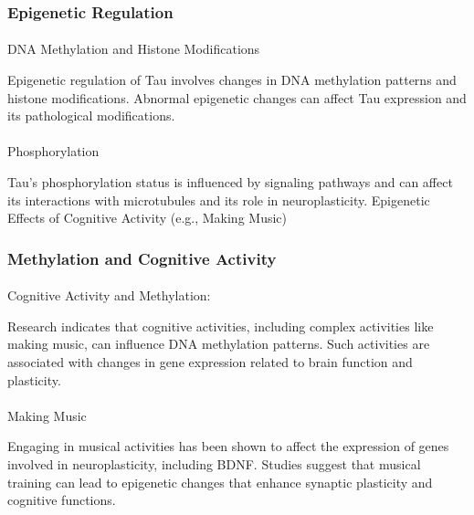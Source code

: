 \documentclass[
]{agujournal2019}
\makeatletter
\let\oldparagraph\paragraph
\renewcommand{\paragraph}{
    \@ifstar
      \xxxParagraphStar
      \xxxParagraphNoStar
  }
\newcommand{\xxxParagraphStar}[1]{\oldparagraph*{#1}\mbox{}}
\newcommand{\xxxParagraphNoStar}[1]{\oldparagraph{#1}\mbox{}}
\makeatother
\begin{document}
\subsubsection{Epigenetic Regulation}\label{epigenetic-regulation-2}

\paragraph{DNA Methylation and Histone
Modifications}\label{dna-methylation-and-histone-modifications}

Epigenetic regulation of Tau involves changes in DNA methylation
patterns and histone modifications. Abnormal epigenetic changes can
affect Tau expression and its pathological modifications.

\paragraph{Phosphorylation}\label{phosphorylation}

Tau's phosphorylation status is influenced by signaling pathways and can
affect its interactions with microtubules and its role in
neuroplasticity. Epigenetic Effects of Cognitive Activity (e.g., Making
Music)

\subsubsection{Methylation and Cognitive
Activity}\label{methylation-and-cognitive-activity}

\paragraph{Cognitive Activity and
Methylation:}\label{cognitive-activity-and-methylation}

Research indicates that cognitive activities, including complex
activities like making music, can influence DNA methylation patterns.
Such activities are associated with changes in gene expression related
to brain function and plasticity.

\paragraph{Making Music}\label{making-music}

Engaging in musical activities has been shown to affect the expression
of genes involved in neuroplasticity, including BDNF. Studies suggest
that musical training can lead to epigenetic changes that enhance
synaptic plasticity and cognitive functions.
\end{document}
